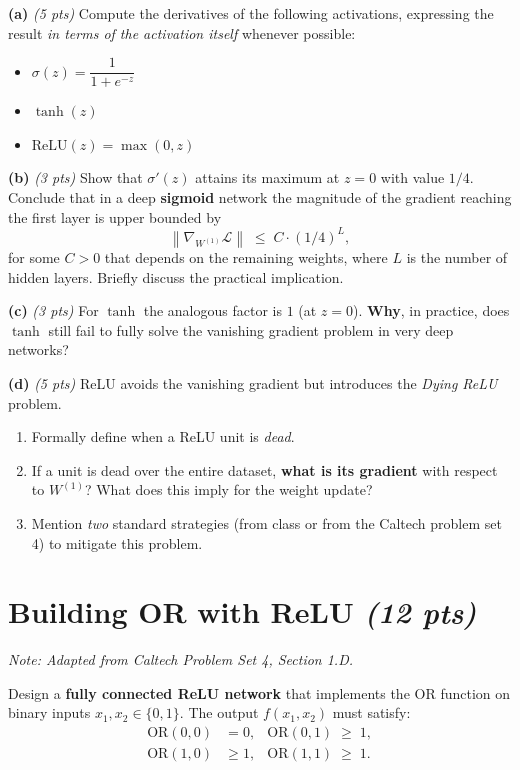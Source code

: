 \documentclass[11pt,letterpaper]{article}
\newcommand{\relu}{\mathrm{ReLU}}
\newcommand{\pts}[1]{\textit{(#1 pts)}\;}
\newcommand{\note}[1]{\textit{\small Note: #1}}
\begin{document}
\textbf{(a)} \pts{5} Compute the derivatives of the following activations,
expressing the result \emph{in terms of the activation itself} whenever possible:
\begin{itemize}[leftmargin=1.5em, itemsep=0pt]
  \item $\sigma(z) = \dfrac{1}{1+e^{-z}}$
  \item $\tanh(z)$
  \item $\relu(z) = \max(0, z)$
\end{itemize}

\textbf{(b)} \pts{3} Show that $\sigma'(z)$ attains its maximum at $z=0$ with
value $1/4$. Conclude that in a deep \textbf{sigmoid} network the magnitude of
the gradient reaching the first layer is upper bounded by
$$
\left\| \nabla_{W^{(1)}} \mathcal{L} \right\| \;\leq\; C \cdot (1/4)^{L},
$$
for some $C > 0$ that depends on the remaining weights, where $L$ is the number
of hidden layers. Briefly discuss the practical implication.

\textbf{(c)} \pts{3} For $\tanh$ the analogous factor is $1$ (at $z=0$).
\textbf{Why}, in practice, does $\tanh$ still fail to fully solve the vanishing
gradient problem in very deep networks?

\textbf{(d)} \pts{5} ReLU avoids the vanishing gradient but introduces the
\emph{Dying ReLU} problem.
\begin{enumerate}[label=(\roman*), leftmargin=2em, itemsep=2pt]
  \item Formally define when a ReLU unit is \emph{dead}.
  \item If a unit is dead over the entire dataset, \textbf{what is its
        gradient} with respect to $W^{(1)}$? What does this imply for the
        weight update?
  \item Mention \emph{two} standard strategies (from class or from the Caltech
        problem set 4) to mitigate this problem.
\end{enumerate}

\section{Building OR with ReLU \pts{12}}

\note{Adapted from Caltech Problem Set 4, Section 1.D.}

Design a \textbf{fully connected ReLU network} that implements the OR function
on binary inputs $x_1, x_2 \in \{0, 1\}$. The output $f(x_1, x_2)$ must satisfy:
$$
\begin{aligned}
\text{OR}(0,0) &= 0, & \text{OR}(0,1) \;\geq\; 1, \\
\text{OR}(1,0) &\geq 1, & \text{OR}(1,1) \;\geq\; 1.
\end{aligned}
$$
\end{document}
